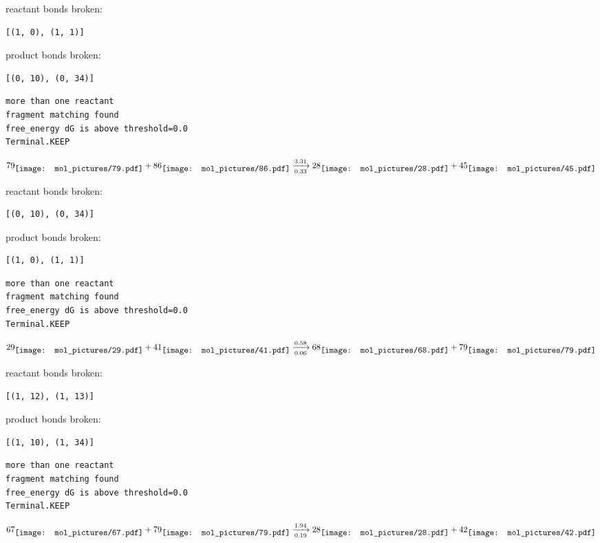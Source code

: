 \documentclass{article}
\begin{document}
reactant bonds broken:\begin{verbatim}
[(1, 0), (1, 1)]
\end{verbatim}
product bonds broken:\begin{verbatim}
[(0, 10), (0, 34)]
\end{verbatim}




\vspace{1cm}
\begin{verbatim}
more than one reactant
fragment matching found
free_energy dG is above threshold=0.0
Terminal.KEEP
\end{verbatim}
$$
79
\raisebox{-.5\height}{\texttt{[image: mol\_pictures/79.pdf]}}
+
86
\raisebox{-.5\height}{\texttt{[image: mol\_pictures/86.pdf]}}
\xrightarrow[0.33]{3.31}
28
\raisebox{-.5\height}{\texttt{[image: mol\_pictures/28.pdf]}}
+
45
\raisebox{-.5\height}{\texttt{[image: mol\_pictures/45.pdf]}}
$$


reactant bonds broken:\begin{verbatim}
[(0, 10), (0, 34)]
\end{verbatim}
product bonds broken:\begin{verbatim}
[(1, 0), (1, 1)]
\end{verbatim}




\vspace{1cm}
\begin{verbatim}
more than one reactant
fragment matching found
free_energy dG is above threshold=0.0
Terminal.KEEP
\end{verbatim}
$$
29
\raisebox{-.5\height}{\texttt{[image: mol\_pictures/29.pdf]}}
+
41
\raisebox{-.5\height}{\texttt{[image: mol\_pictures/41.pdf]}}
\xrightarrow[0.06]{0.58}
68
\raisebox{-.5\height}{\texttt{[image: mol\_pictures/68.pdf]}}
+
79
\raisebox{-.5\height}{\texttt{[image: mol\_pictures/79.pdf]}}
$$


reactant bonds broken:\begin{verbatim}
[(1, 12), (1, 13)]
\end{verbatim}
product bonds broken:\begin{verbatim}
[(1, 10), (1, 34)]
\end{verbatim}




\vspace{1cm}
\begin{verbatim}
more than one reactant
fragment matching found
free_energy dG is above threshold=0.0
Terminal.KEEP
\end{verbatim}
$$
67
\raisebox{-.5\height}{\texttt{[image: mol\_pictures/67.pdf]}}
+
79
\raisebox{-.5\height}{\texttt{[image: mol\_pictures/79.pdf]}}
\xrightarrow[0.19]{1.94}
28
\raisebox{-.5\height}{\texttt{[image: mol\_pictures/28.pdf]}}
+
42
\raisebox{-.5\height}{\texttt{[image: mol\_pictures/42.pdf]}}
$$
\end{document}
